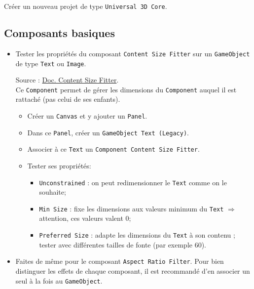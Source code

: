 \documentclass[a4paper,10pt]{article}
\newenvironment{solution}%
{\begin{tcolorbox}[breakable,colback=red!5!white,colframe=red!75!black,title=Solution]}%
{\end{tcolorbox}}
\begin{document}
\ifversionenseignant
\begin{solution}
Créer un nouveau projet de type \texttt{Universal 3D Core}.
	
\end{solution}
\fi 

\subsection*{Composants basiques}

\begin{itemize}
	  \item Tester les propriétés du  composant \texttt{Content Size Fitter} sur un \texttt{GameObject} de type \texttt{Text} ou \texttt{Image}.
	  
\ifversionenseignant
\begin{solution}
Source : \href{https://docs.unity3d.com/Packages/com.unity.ugui@1.0/manual/script-ContentSizeFitter.html}{Doc. Content Size Fitter}.\\

Ce \texttt{Component} permet de gérer les dimensions du \texttt{Component} auquel il est rattaché (pas celui de ses enfants).

\begin{itemize}
	\item Créer un \texttt{Canvas} et y ajouter un \texttt{Panel}.
	\item Dans ce \texttt{Panel}, créer un \texttt{GameObject Text (Legacy)}.
	\item Associer à ce \texttt{Text} un \texttt{Component Content Size Fitter}.
	\item Tester ses propriétés:
	\begin{itemize}
		\item 	\texttt{Unconstrained} : on peut redimensionner le \texttt{Text} comme on le souhaite;
		\item \texttt{Min Size} : fixe les dimensions aux valeurs minimum du \texttt{Text} $\Rightarrow$ attention, ces valeurs valent 0;
		\item \texttt{Preferred Size} : adapte les dimensions du \texttt{Text} à son contenu ; tester avec différentes tailles de fonte (par exemple 60).		
	\end{itemize}	
\end{itemize}

\end{solution}
\fi 
	  
	  \item Faites de même pour le composant \texttt{Aspect Ratio Filter}. Pour bien distinguer les effets de chaque composant, il est recommandé d'en associer un seul à la fois au \texttt{GameObject}.
	  

\end{itemize}
\end{document}
